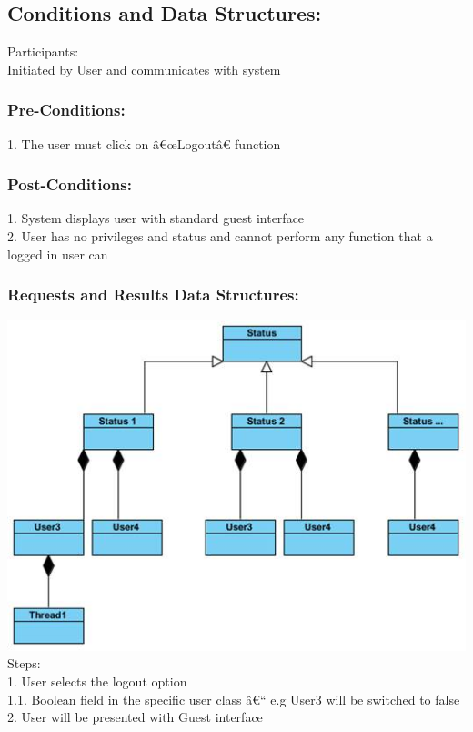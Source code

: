 \documentclass[a4paper,11pt]{article}
\begin{document}
\subsection{Conditions and Data Structures:}
Participants:\\
Initiated by User and communicates with system\\
\subsubsection*{Pre-Conditions:}
1.	The user must click on â€œLogoutâ€ function\\
\subsubsection*{Post-Conditions:}
1.	System displays user with standard guest interface\\
2.	User has no privileges and status and cannot perform any function that a logged in user can\\
\subsubsection*{Requests and Results Data Structures:}
\includegraphics[width=1\linewidth]{./Images/CRUDThread/Diagrams/17.jpg}\\
Steps:\\
1.	User selects the logout option\\
1.1.	Boolean field in the specific user class â€“ e.g User3 will be switched to false\\
2.	User will be presented with Guest interface\\
\end{document}
